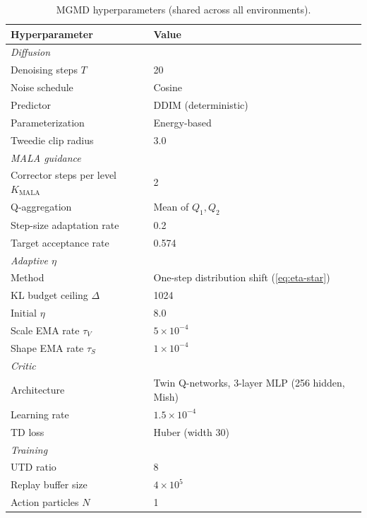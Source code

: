 \documentclass{article}
\theoremstyle{plain}
\theoremstyle{definition}
\theoremstyle{remark}
\begin{document}
\begin{table}[h]
  \caption{MGMD hyperparameters (shared across all environments).}
  \label{tab:hyperparams}
  \vskip 0.1in
  \centering
  \begin{small}
  \begin{tabular}{ll}
    \toprule
    \textbf{Hyperparameter} & \textbf{Value} \\
    \midrule
    \multicolumn{2}{l}{\textit{Diffusion}} \\
    Denoising steps $T$ & 20 \\
    Noise schedule & Cosine \\
    Predictor & DDIM (deterministic) \\
    Parameterization & Energy-based \\
    Tweedie clip radius & 3.0 \\
    \midrule
    \multicolumn{2}{l}{\textit{MALA guidance}} \\
    Corrector steps per level $K_{\text{MALA}}$ & 2 \\
    Q-aggregation & Mean of $Q_1, Q_2$ \\
    Step-size adaptation rate & 0.2 \\
    Target acceptance rate & 0.574 \\
    \midrule
    \multicolumn{2}{l}{\textit{Adaptive $\eta$}} \\
    Method & One-step distribution shift (\cref{eq:eta-star}) \\
    KL budget ceiling $\Delta$ & 1024 \\
    Initial $\eta$ & 8.0 \\
    Scale EMA rate $\tau_V$ & $5 \times 10^{-4}$ \\
    Shape EMA rate $\tau_S$ & $1 \times 10^{-4}$ \\
    \midrule
    \multicolumn{2}{l}{\textit{Critic}} \\
    Architecture & Twin Q-networks, 3-layer MLP (256 hidden, Mish) \\
    Learning rate & $1.5 \times 10^{-4}$ \\
    TD loss & Huber (width 30) \\
    \midrule
    \multicolumn{2}{l}{\textit{Training}} \\
    UTD ratio & 8 \\
    Replay buffer size & $4 \times 10^5$ \\
    Action particles $N$ & 1 \\
    \bottomrule
  \end{tabular}
  \end{small}
\end{table}
\end{document}
